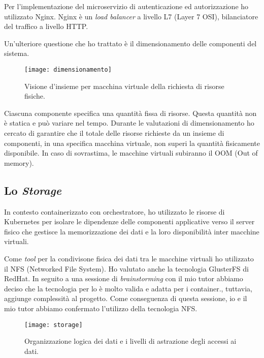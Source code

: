 Per l'implementazione del microservizio di autenticazione ed autorizzazione 
ho utilizzato Nginx. Nginx è un \textit{load balancer} a livello L7 (Layer 7 OSI), 
bilanciatore del traffico a livello HTTP.

Un'ulteriore questione che ho trattato è il dimensionamento delle componenti 
del sistema. 

\begin{figure}[htbp]
	\begin{center}
		\texttt{[image: dimensionamento]}
		\caption{Visione d'insieme per macchina virtuale della richiesta di risorse fisiche.}
	\end{center}
\end{figure}

Ciascuna componente specifica una quantità fissa di risorse. 
Questa quantità non è statica e può variare nel tempo. Durante le 
valutazioni di dimensionamento ho cercato di garantire che il 
totale delle risorse richieste da un insieme di componenti, in una specifica
macchina virtuale, non superi la quantità fisicamente disponibile.
In caso di sovrastima, le macchine virtuali subiranno il OOM (Out of memory).

\newpage   

\subsection{Lo \textit{Storage}}

In contesto containerizzato con orchestratore,
ho utilizzato le risorse di Kubernetes per
isolare le dipendenze delle componenti applicative verso 
il server fisico che gestisce la memorizzazione dei
dati e la loro disponibilità inter macchine virtuali. 

Come \textit{tool} per la condivisone fisica dei dati 
tra le macchine virtuali ho utilizzato il NFS (Networked File System).
Ho valutato anche la tecnologia GlusterFS di RedHat. In seguito a una 
sessione di \textit{brainstorming} con il mio tutor 
abbiamo deciso che la tecnologia per lo  
è molto valida e adatta per i container., tuttavia, aggiunge
complessità al progetto. Come conseguenza di questa sessione, 
io e il mio tutor abbiamo confermato l'utilizzo della tecnologia 
NFS.
  
\begin{figure}[htbp]
	\begin{center}
		\texttt{[image: storage]}
		\caption{Organizzazione logica dei dati e i livelli di astrazione degli accessi ai dati.}
	\end{center}
\end{figure}

